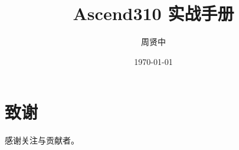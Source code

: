 \documentclass[fontsize=12pt, paper=a4, oneside, openany]{scrbook}
\title{Ascend310 实战手册}
\author{周贤中}
\date{\today}
\begin{document}
\frontmatter
\maketitle
\tableofcontents
\mainmatter



\backmatter
\chapter*{致谢}
感谢关注与贡献者。
\end{document}
